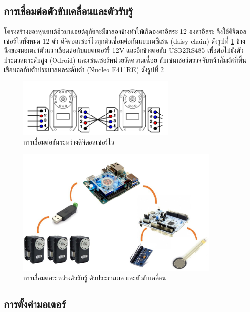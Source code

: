 {\subsection{การเชื่อมต่อตัวขับเคลื่อนและตัวรับรู้}
โครงสร้างของหุ่นยนต์ฮิวมานอยด์อุทัยจะมีขาสองข้างทำให้เกิดองศาอิสระ 12 องศาอิสระ
จึงใช้ดิจิตอลเซอร์โวทั้งหมด 12 ตัว ดิจิตอลเซอร์โวทุกตัวเชื่อมต่อกันแบบเดซี่เชน (daisy chain) ดังรูปที่ \ref{fig:dynamixel_connect}
ข้างนึงของมอเตอร์ตัวแรกเชื่อมต่อกับแบตเตอร์รี่ 12V และอีกข้างต่อกับ USB2RS485 เพื่อต่อไปยังตัวประมวลผระดับสูง (Odroid)
และเซนเซอร์หน่วยวัดความเฉื่อย กับเซนเซอร์ตรวจจับหน้าสัมผัสที่พื้นเชื่อมต่อกับตัวประมวลผลระดับต่ำ (Nucleo F411RE)
ดังรูปที่ \ref{fig:odroid2dynamixel}
\begin{figure}[!ht]
    \centering
    \includegraphics[width=0.7\textwidth]{chapter3/images/dynamixel_connect.png}
    \caption{การเชื่อมต่อกันระหว่างดิจิตอลเซอร์โว}
    \label{fig:dynamixel_connect}
\end{figure}
\begin{figure}[!ht]
    \centering
    \includegraphics[width=0.9\textwidth]{chapter3/images/odroid2dynamixel.JPG}
    \caption{การเชื่อมต่อระหว่างตัวรับรู้ ตัวประมวลผล และตัวขับเคลื่อน}
    \label{fig:odroid2dynamixel}
\end{figure}


\clearpage
\subsection{การตั้งค่ามอเตอร์}

}
